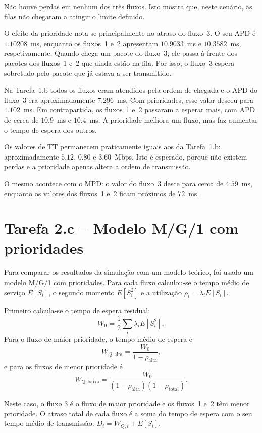 \documentclass[11pt,a4paper]{article}
\begin{document}
Não houve perdas em nenhum dos três fluxos. Isto mostra que, neste cenário, as
filas não chegaram a atingir o limite definido.

O efeito da prioridade nota-se principalmente no atraso do fluxo~3. O seu APD é
$1.10208$~ms, enquanto os fluxos~1 e~2 apresentam $10.9033$~ms e
$10.3582$~ms, respetivamente. Quando chega um pacote do fluxo~3, ele passa à
frente dos pacotes dos fluxos~1 e~2 que ainda estão na fila. Por isso, o
fluxo~3 espera sobretudo pelo pacote que já estava a ser transmitido.

Na Tarefa~1.b todos os fluxos eram atendidos pela ordem de chegada e o APD do
fluxo~3 era aproximadamente $7.296$~ms. Com prioridades, esse valor desceu
para $1.102$~ms. Em contrapartida, os fluxos~1 e~2 passaram a esperar mais,
com APD de cerca de $10.9$~ms e $10.4$~ms. A prioridade melhora um fluxo, mas
faz aumentar o tempo de espera dos outros.

Os valores de TT permanecem praticamente iguais aos da Tarefa~1.b:
aproximadamente $5.12$, $0.80$ e $3.60$~Mbps. Isto é esperado, porque não
existem perdas e a prioridade apenas altera a ordem de transmissão.

O mesmo acontece com o MPD: o valor do fluxo~3 desce para cerca de $4.59$~ms,
enquanto os valores dos fluxos~1 e~2 ficam próximos de $72$~ms.

\newpage

\section{Tarefa 2.c -- Modelo M/G/1 com prioridades}

Para comparar os resultados da simulação com um modelo teórico, foi usado um
modelo M/G/1 com prioridades. Para cada fluxo calculou-se o tempo médio de
serviço $E[S_i]$, o segundo momento $E[S_i^2]$ e a utilização
$\rho_i=\lambda_iE[S_i]$.

Primeiro calcula-se o tempo de espera residual:
\[
W_0=\frac{1}{2}\sum_i\lambda_iE[S_i^2],
\]
Para o fluxo de maior prioridade, o tempo médio de espera é
\[
W_{Q,\mathrm{alta}}=\frac{W_0}{1-\rho_{\mathrm{alta}}},
\]
e para os fluxos de menor prioridade é
\[
W_{Q,\mathrm{baixa}}=
\frac{W_0}{(1-\rho_{\mathrm{alta}})(1-\rho_{\mathrm{total}})}.
\]

Neste caso, o fluxo 3 é o fluxo de maior prioridade e os fluxos~1 e~2 têm
menor prioridade. O atraso total de cada fluxo é a soma do tempo de espera com
o seu tempo médio de transmissão:
$D_i=W_{Q,i}+E[S_i]$.
\end{document}
